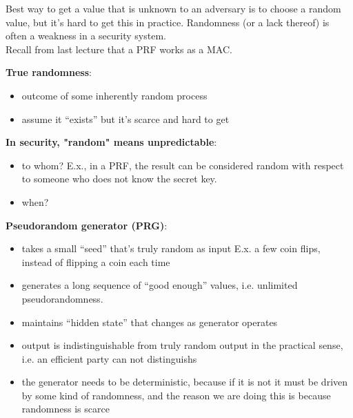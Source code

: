 Best way to get a value that is unknown to an adversary is to choose a random
value, but it's hard to get this in practice. Randomness (or a lack thereof) is often a weakness in a security system.\\

Recall from last lecture that a PRF works as a MAC.


{\bf True randomness}:
\begin{itemize}
    \item outcome of some inherently random process
    \item assume it ``exists'' but it's scarce and hard to get
\end{itemize}

{\bf In security, "random" means unpredictable}:
\begin{itemize}
    \item to whom? E.x., in a PRF, the result can be considered random with respect to someone who does not know the secret key.
    \item when?
\end{itemize}

{\bf Pseudorandom generator (PRG)}:
\begin{itemize}
    \item takes a small ``seed'' that's truly random as input E.x. a few coin flips, instead of flipping a coin each time
    \item generates a long sequence of ``good enough'' values, i.e. unlimited pseudorandomness.
    \item maintains ``hidden state'' that changes as generator operates
    \item output is indistinguishable from truly random output in the practical sense, i.e. an efficient party can not distinguishs
    \item the generator needs to be deterministic, because if it is not it must be driven by some kind of randomness, and the reason we are doing this is because randomness is scarce
\end{itemize}

